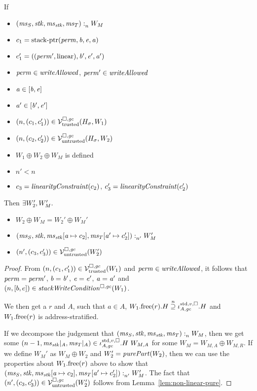 \begin{lemma}
  \label{lem:store-stack-works}
  If
  \begin{itemize}
  \item $\memSat{(\ms_S,\stk,\ms_\stk,\ms_T)}{W_M}$
  \item $c_1 = \stkptr{\perm,\baddr,\eaddr,\aaddr}$
  \item $c_1' = ((\perm',\linear),\baddr',\eaddr',\aaddr')$
  \item $\perm \in \writeAllowed{}$, $\perm' \in \writeAllowed{}$
  \item $\aaddr \in [\baddr,\eaddr]$
  \item $\aaddr' \in [\baddr',\eaddr']$
  \item $\npair{(c_1,c_1')}\in\lrvg{\trusted}(H_\sigma,W_1)$
  \item $\npair{(c_2,c_2')}\in\lrv(H_\sigma,W_2)$
  \item $W_1 \oplus W_2 \oplus W_M$ is defined
  \item $n' < n$
  \item $c_3 = \linCons{c_2}$, $c_3' = \linCons{c_2'}$
  \end{itemize}
  Then $\exists W_2', W_M'\ldotp$
  \begin{itemize}
  \item $W_2 \oplus W_M = W_2' \oplus W_M'$
  \item $\memSat[n']{(\ms_S,\stk,\ms_\stk\update{\aaddr}{c_2},\ms_T\update{\aaddr'}{c_2'})}{W_M'}$
  \item $\npair[n']{(c_3,c_3')} \in \lrv(W_2')$
  \end{itemize}
\end{lemma}
\begin{proof}
  From $\npair{(c_1,c_1')}\in\lrvg{\trusted}(W_1)$ and $\perm \in \writeAllowed{}$, it follows that $\perm = \perm'$, $\baddr = \baddr'$, $\eaddr = \eaddr'$, $\aaddr = \aaddr'$ and $\npair{[b,e]} \in \stackWriteCond{W_1}$. 

  We then get a $r$ and $A$, such that $a \in A$, $\pwfree[W_1](r).H \nsupeq \stdreg{A,\gc}{v}.H$ and $\pwfree[W_1](r)$ is address-stratified.

  If we decompose the judgement that $\memSat{(\ms_S,\stk,\ms_\stk,\ms_T)}{W_M}$, then we get some $\npair[n-1]{\ms_\stk|_A, \ms_T|_A} \in \stdreg{A,\gc}{v}.H~W_{M,A}$ for some $W_M = W_{M,A} \oplus W_{M,R}$.
  If we define $W_M'$ as $W_M \oplus W_2$ and $W_2' = \purePart{W_2}$, then we can use the properties about $\pwfree[W_1](r)$ above to show that  $\memSat[n']{(\ms_S,\stk,\ms_\stk\update{\aaddr}{c_2},\ms_T\update{\aaddr'}{c_2'})}{W_M'}$.
  The fact that $\npair[n']{(c_3,c_3')} \in \lrv(W_2')$ follows from Lemma~\ref{lem:non-linear-pure}.
\end{proof}


